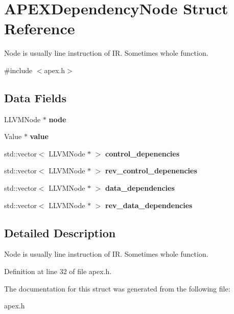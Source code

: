 \section{A\+P\+E\+X\+Dependency\+Node Struct Reference}
\label{structAPEXDependencyNode}


Node is usually line instruction of IR. Sometimes whole function.  




{\ttfamily \#include $<$apex.\+h$>$}

\subsection*{Data Fields}
\begin{DoxyCompactItemize}
\item 
\mbox{\label{structAPEXDependencyNode_a970e7a2fef904e104bff4c2fc5ff2cb1}} 
L\+L\+V\+M\+Node $\ast$ {\bfseries node}
\item 
\mbox{\label{structAPEXDependencyNode_a8b3b641572bf365c4f731fc83b169984}} 
Value $\ast$ {\bfseries value}
\item 
\mbox{\label{structAPEXDependencyNode_a6c402ac3d515fb024c9d8e08aced4f5c}} 
std\+::vector$<$ L\+L\+V\+M\+Node $\ast$ $>$ {\bfseries control\+\_\+depenencies}
\item 
\mbox{\label{structAPEXDependencyNode_ae526db6103f708c8cfacbb0af242c65f}} 
std\+::vector$<$ L\+L\+V\+M\+Node $\ast$ $>$ {\bfseries rev\+\_\+control\+\_\+depenencies}
\item 
\mbox{\label{structAPEXDependencyNode_ade99c6315545e206d562789348540cc0}} 
std\+::vector$<$ L\+L\+V\+M\+Node $\ast$ $>$ {\bfseries data\+\_\+dependencies}
\item 
\mbox{\label{structAPEXDependencyNode_abcf07bec655009d666e6f2c1163f4dcb}} 
std\+::vector$<$ L\+L\+V\+M\+Node $\ast$ $>$ {\bfseries rev\+\_\+data\+\_\+dependencies}
\end{DoxyCompactItemize}


\subsection{Detailed Description}
Node is usually line instruction of IR. Sometimes whole function. 

Definition at line 32 of file apex.\+h.



The documentation for this struct was generated from the following file\+:\begin{DoxyCompactItemize}
\item 
apex.\+h\end{DoxyCompactItemize}
